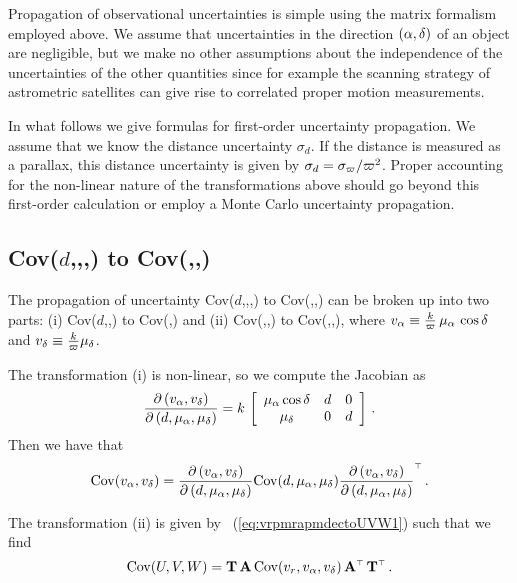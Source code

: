 Propagation of observational uncertainties is simple using the matrix
formalism employed above. We assume that uncertainties in the
direction $(\alpha,\delta)$ of an object are negligible, but we make no
other assumptions about the independence of the uncertainties of the
other quantities since for example the scanning strategy of
astrometric satellites can give rise to correlated proper motion
measurements.

In what follows we give formulas for first-order uncertainty
propagation. We assume that we know the distance uncertainty
$\sigma_d$. If the distance is measured as a parallax, this distance
uncertainty is given by $\sigma_d =
\sigma_{\varpi}/\varpi^2$. Proper accounting for the non-linear
nature of the transformations above should go beyond this first-order
calculation or employ a Monte Carlo uncertainty propagation.

\subsection{Cov($d$,\vrr,\pmra,\pmdec) to Cov(\galU,\galV,\galW)}

The propagation of uncertainty Cov($d$,\vrr,\pmra,\pmdec) to
Cov(\galU,\galV,\galW) can be broken up into two parts: (i)
Cov($d$,\pmra,\pmdec) to Cov(\vra,\vdec) and (ii) Cov(\vrr,\vra,\vdec)
to Cov(\galU,\galV,\galW), where $v_{\alpha} \equiv
\frac{k}{\varpi}\,\mu_{\alpha}\,\cos\delta$ and $v_{\delta} \equiv
\frac{k}{\varpi}\mu_{\delta}$.

The transformation (i) is non-linear, so we compute the Jacobian as
\begin{equation}
\frac{\partial \left(v_{\alpha},v_{\delta}\right)}{\partial\left(d,\mu_{\alpha},\mu_{\delta}\right)}
= k\,\left[ \begin{array}{ccc} \mu_{\alpha} \cos \delta & d & 0\\\mu_{\delta} & 0 & d\end{array} \right] \,.
\end{equation}
Then we have that
\begin{equation}
\mathrm{Cov}(v_{\alpha},v_{\delta}) = \frac{\partial \left(
  v_{\alpha},v_{\delta}\right)}{\partial \left(d,\mu_{\alpha},\mu_{\delta}\right)}
\mathrm{Cov}(d,\mu_{\alpha},\mu_{\delta}) \frac{\partial \left(
  v_{\alpha},v_{\delta}\right)}{\partial \left(d,\mu_{\alpha},\mu_{\delta}\right)}^{\scriptscriptstyle \top}\,.
\end{equation}

The transformation (ii) is given by
\eqnname~(\ref{eq:vrpmrapmdectoUVW1}) such that we find
\begin{equation}
\mathrm{Cov}(U,V,W) = \mathbf{T}\,\mathbf{A} \, \mathrm{Cov}(v_r,v_{\alpha},v_{\delta}) \, \mathbf{A}^{\scriptscriptstyle \top}\,\mathbf{T}^{\scriptscriptstyle \top}\,.
\end{equation}

